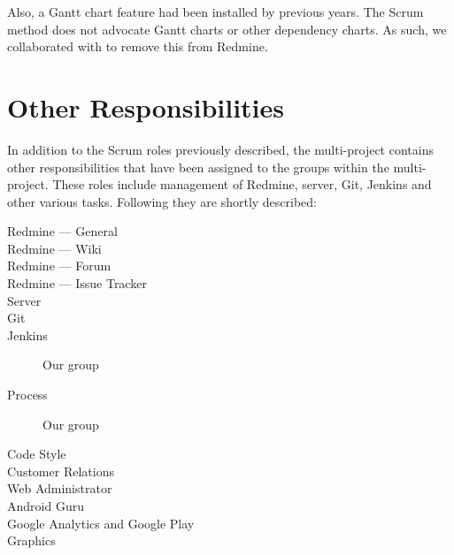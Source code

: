 Also, a Gantt chart feature had been installed by previous years. The Scrum method does not advocate Gantt charts or other dependency charts. As such, we collaborated with  to remove this from Redmine.

\section{Other Responsibilities}\label{sec:responsibilities}
In addition to the Scrum roles previously described, the multi-project contains other responsibilities that have been assigned to the groups within the multi-project. These roles include management of Redmine, server, Git, Jenkins and other various tasks. Following they are shortly described:

\begin{description}
  \item[Redmine --- General] \dummy \dummy
  \item[Redmine --- Wiki] \dummy \dummy
  \item[Redmine --- Forum] \dummy
  \item[Redmine --- Issue Tracker] \dummy \dummy
  \item[Server] \dummy \dummy
  \item[Git] \dummy \dummy
  \item[Jenkins] Our group
  \item[Process] Our group
  \item[Code Style] \dummy \dummy
  \item[Customer Relations] 
  \item[Web Administrator] \dummy \dummy
  \item[Android Guru] \dummy \dummy
  \item[Google Analytics and Google Play] \dummy \dummy
  \item[Graphics] \dummy \dummy
\end{description}